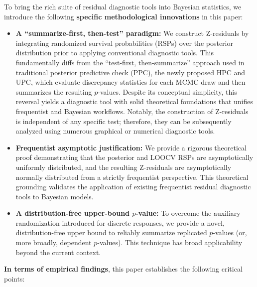 \documentclass[11pt]{article}
\begin{document}
To bring the rich suite of residual diagnostic tools into Bayesian statistics, we introduce the following \textbf{specific methodological innovations} in this paper:
\begin{itemize}
    \item \textbf{A ``summarize-first, then-test'' paradigm:} We construct Z-residuals by integrating randomized survival probabilities (RSPs) over the posterior distribution prior to applying conventional diagnostic tools. This fundamentally diffs from the ``test-first, then-summarize'' approach used in traditional posterior predictive check (PPC), the newly proposed HPC and UPC, which evaluate discrepancy statistics for each MCMC draw and then summarizes the resulting $p$-values. Despite its conceptual simplicity, this reversal yields a diagnostic tool with solid theoretical foundations that unifies frequentist and Bayesian workflows. Notably, the construction of Z-residuals is independent of any specific test; therefore, they can be subsequently analyzed using numerous graphical or numerical diagnostic tools.
    \item \textbf{Frequentist asymptotic justification:} We provide a rigorous theoretical proof demonstrating that the posterior and LOOCV RSPs are asymptotically uniformly distributed, and the resulting Z-residuals are asymptotically normally distributed from a strictly frequentist perspective. This theoretical grounding validates the application of existing frequentist residual diagnostic tools to Bayesian models. 
    \item \textbf{A distribution-free upper-bound $p$-value:} To overcome the auxiliary randomization introduced for discrete responses, we provide a novel, distribution-free upper bound to reliably summarize replicated $p$-values (or, more broadly, dependent $p$-values). This technique has broad applicability beyond the current context.
\end{itemize}

\textbf{In terms of empirical findings}, this paper establishes the following critical points: 
\end{document}
